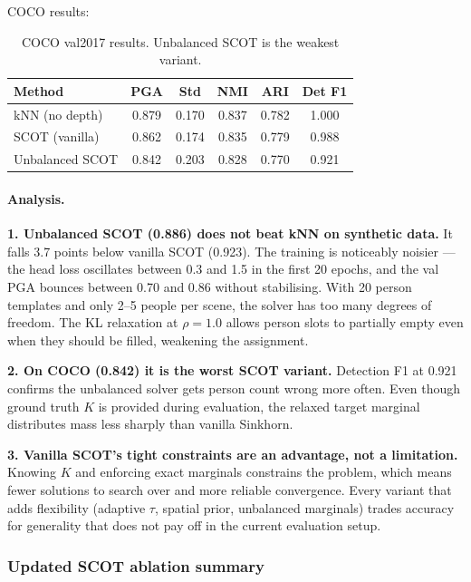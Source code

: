 COCO results:

\begin{table}[H]
\centering
\footnotesize
\begin{tabular}{lccccc}
\toprule
Method & PGA & Std & NMI & ARI & Det F1 \\
\midrule
kNN (no depth) & 0.879 & 0.170 & 0.837 & 0.782 & 1.000 \\
SCOT (vanilla) & 0.862 & 0.174 & 0.835 & 0.779 & 0.988 \\
Unbalanced SCOT & 0.842 & 0.203 & 0.828 & 0.770 & 0.921 \\
\bottomrule
\end{tabular}
\caption{COCO val2017 results. Unbalanced SCOT is the weakest variant.}
\end{table}


\paragraph{Analysis.}

\textbf{1. Unbalanced SCOT (0.886) does not beat kNN on synthetic data.} It falls 3.7 points below vanilla SCOT (0.923). The training is noticeably noisier --- the head loss oscillates between 0.3 and 1.5 in the first 20 epochs, and the val PGA bounces between 0.70 and 0.86 without stabilising. With 20 person templates and only 2--5 people per scene, the solver has too many degrees of freedom. The KL relaxation at $\rho = 1.0$ allows person slots to partially empty even when they should be filled, weakening the assignment.

\textbf{2. On COCO (0.842) it is the worst SCOT variant.} Detection F1 at 0.921 confirms the unbalanced solver gets person count wrong more often. Even though ground truth $K$ is provided during evaluation, the relaxed target marginal distributes mass less sharply than vanilla Sinkhorn.

\textbf{3. Vanilla SCOT's tight constraints are an advantage, not a limitation.} Knowing $K$ and enforcing exact marginals constrains the problem, which means fewer solutions to search over and more reliable convergence. Every variant that adds flexibility (adaptive $\tau$, spatial prior, unbalanced marginals) trades accuracy for generality that does not pay off in the current evaluation setup.


\subsubsection{Updated SCOT ablation summary}

